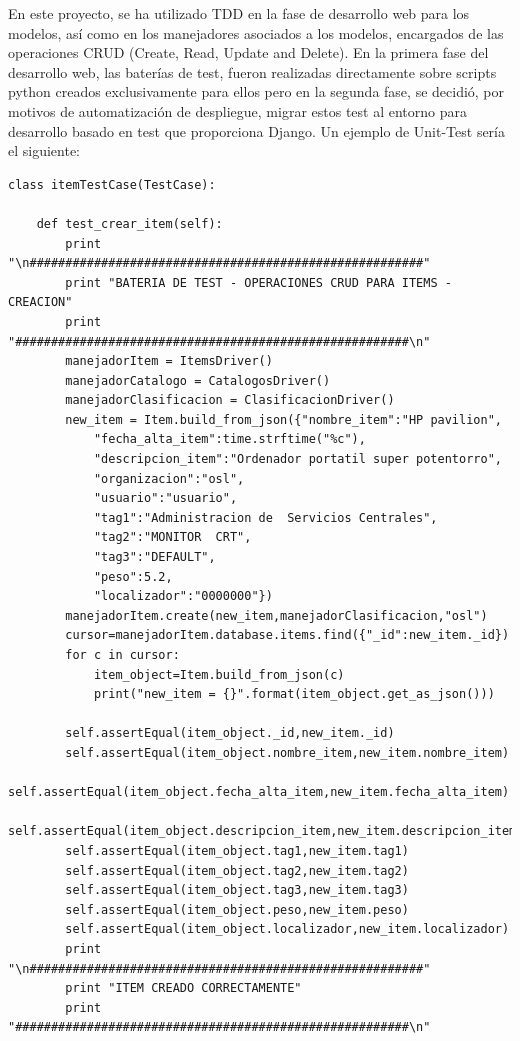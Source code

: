\documentclass[a4paper,11pt]{book}
\begin{document}
En este proyecto, se ha utilizado TDD en la fase de desarrollo web para los modelos, así como en los manejadores asociados a los modelos, encargados de las operaciones CRUD (Create, Read, Update and Delete). En la primera fase del desarrollo web, las baterías de test, fueron realizadas directamente sobre scripts python creados exclusivamente para ellos pero en la segunda fase, se decidió, por motivos de automatización de despliegue,  migrar estos test al entorno para desarrollo basado en test que proporciona Django. Un ejemplo de Unit-Test sería el siguiente:
\begin{lstlisting}
class itemTestCase(TestCase):

    def test_crear_item(self):
        print "\n#######################################################"
        print "BATERIA DE TEST - OPERACIONES CRUD PARA ITEMS - CREACION"
        print "#######################################################\n"
        manejadorItem = ItemsDriver()
        manejadorCatalogo = CatalogosDriver()
        manejadorClasificacion = ClasificacionDriver()
        new_item = Item.build_from_json({"nombre_item":"HP pavilion",
            "fecha_alta_item":time.strftime("%c"),
            "descripcion_item":"Ordenador portatil super potentorro",
            "organizacion":"osl",
            "usuario":"usuario",
            "tag1":"Administracion de  Servicios Centrales",
            "tag2":"MONITOR  CRT",
            "tag3":"DEFAULT",
            "peso":5.2,
            "localizador":"0000000"})
        manejadorItem.create(new_item,manejadorClasificacion,"osl")
        cursor=manejadorItem.database.items.find({"_id":new_item._id})
        for c in cursor:
            item_object=Item.build_from_json(c)
            print("new_item = {}".format(item_object.get_as_json()))

        self.assertEqual(item_object._id,new_item._id)
        self.assertEqual(item_object.nombre_item,new_item.nombre_item)
        self.assertEqual(item_object.fecha_alta_item,new_item.fecha_alta_item)
        self.assertEqual(item_object.descripcion_item,new_item.descripcion_item)
        self.assertEqual(item_object.tag1,new_item.tag1)
        self.assertEqual(item_object.tag2,new_item.tag2)
        self.assertEqual(item_object.tag3,new_item.tag3)
        self.assertEqual(item_object.peso,new_item.peso)
        self.assertEqual(item_object.localizador,new_item.localizador)
        print "\n#######################################################"
        print "ITEM CREADO CORRECTAMENTE"
        print "#######################################################\n"
\end{lstlisting}
\end{document}
